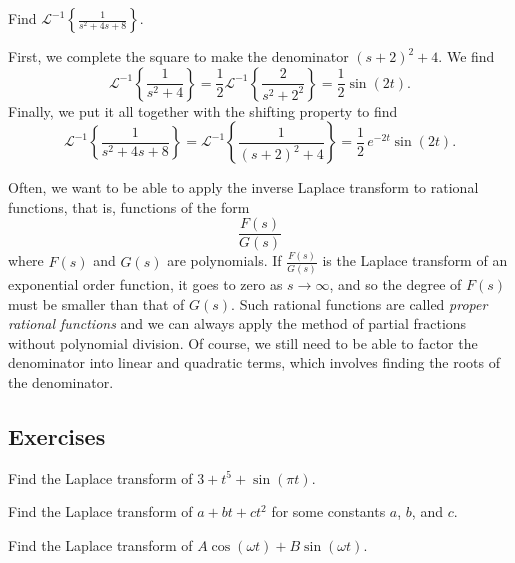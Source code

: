 \begin{example}
Find
${\mathcal{L}}^{-1} \left\{ \frac{1}{s^2+4s+8} \right\}$.

First, we complete the square to make the denominator ${(s+2)}^2+4$.  
We find
\begin{equation*}
{\mathcal{L}}^{-1} \left\{ \frac{1}{s^2+4} \right\}
=
\frac{1}{2}
{\mathcal{L}}^{-1} \left\{ \frac{2}{s^2+2^2} \right\}
=
\frac{1}{2} \sin (2t) .
\end{equation*}
Finally, we put it all together with the shifting property to find
\begin{equation*}
{\mathcal{L}}^{-1} \left\{ \frac{1}{s^2+4s+8} \right\} = 
{\mathcal{L}}^{-1} \left\{ \frac{1}{{(s+2)}^2+4} \right\}
=
\frac{1}{2}\,e^{-2t} \sin (2t) .
\end{equation*}
\end{example}

Often, we want to be able to apply the inverse Laplace transform to
rational functions, that is, functions of the form
\begin{equation*}
\frac{F(s)}{G(s)}
\end{equation*}
where $F(s)$ and $G(s)$ are polynomials.  If $\frac{F(s)}{G(s)}$ is
the Laplace transform of an exponential order function,
it goes to zero as $s \to \infty$, and so the degree of $F(s)$
must be smaller than that of $G(s)$.  Such rational functions
are called \emph{proper rational functions}
and we can always apply the method of partial fractions without polynomial
division.
Of course, we still need to be able to factor the denominator into
linear and quadratic terms, which involves finding the roots of the
denominator.

\subsection{Exercises}

\begin{exercise}
Find the Laplace transform of $3+t^5+\sin (\pi t)$.
\end{exercise}

\begin{exercise}
Find the Laplace transform of $a+bt+ct^2$ for some constants $a$, $b$, and
$c$.
\end{exercise}

\begin{exercise}
Find the Laplace transform of $A \cos (\omega t) + B \sin (\omega t)$.
\end{exercise}

